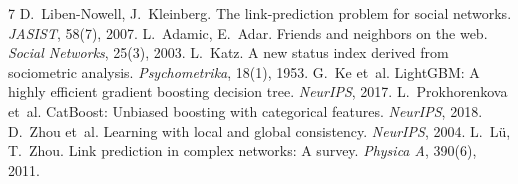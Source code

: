 \documentclass[10pt,a4paper,twocolumn]{article}
\begin{document}
\vspace{4pt}
\small
\begin{thebibliography}{7}
 D.~Liben-Nowell, J.~Kleinberg. The link-prediction problem for social networks. \emph{JASIST}, 58(7), 2007.
 L.~Adamic, E.~Adar. Friends and neighbors on the web. \emph{Social Networks}, 25(3), 2003.
 L.~Katz. A new status index derived from sociometric analysis. \emph{Psychometrika}, 18(1), 1953.
 G.~Ke et~al. LightGBM: A highly efficient gradient boosting decision tree. \emph{NeurIPS}, 2017.
 L.~Prokhorenkova et~al. CatBoost: Unbiased boosting with categorical features. \emph{NeurIPS}, 2018.
 D.~Zhou et~al. Learning with local and global consistency. \emph{NeurIPS}, 2004.
 L.~L{\"u}, T.~Zhou. Link prediction in complex networks: A survey. \emph{Physica A}, 390(6), 2011.
\end{thebibliography}
\end{document}
